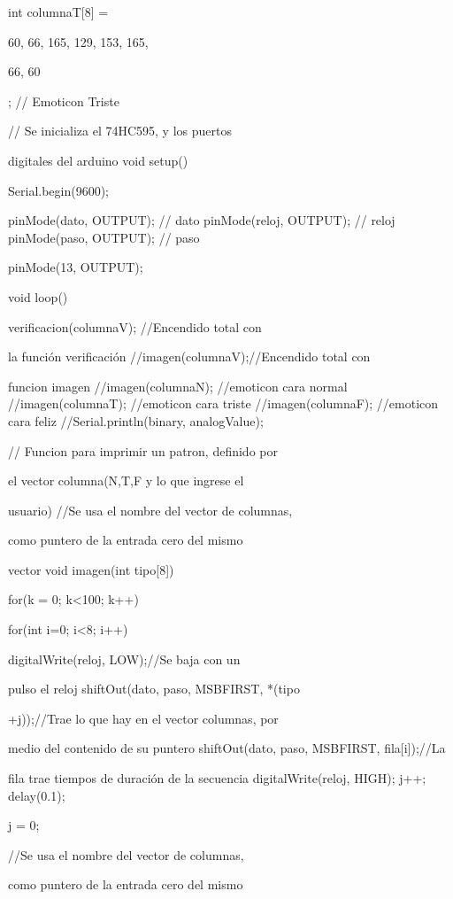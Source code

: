\documentclass{article}
\begin{document}
int columnaT[8] = {60, 66, 165, 129, 153, 165, 

66, 60}; // Emoticon Triste

// Se inicializa el 74HC595, y los puertos 

digitales del arduino
void setup()
{
  Serial.begin(9600);
 
  pinMode(dato, OUTPUT); // dato
  pinMode(reloj, OUTPUT); // reloj
  pinMode(paso, OUTPUT); // paso
  
  pinMode(13, OUTPUT);
}


void loop()
{
   verificacion(columnaV); //Encendido total con 

la función verificación
  //imagen(columnaV);//Encendido total con 

funcion imagen
   //imagen(columnaN); //emoticon cara normal
   //imagen(columnaT); //emoticon cara triste
  //imagen(columnaF); //emoticon cara feliz
  //Serial.println(binary, analogValue);
   
}
  
// Funcion para imprimir un patron, definido por 

el vector columna(N,T,F y lo que ingrese el 

usuario)
//Se usa el nombre del vector de columnas, 

como puntero de la entrada cero del mismo 

vector
void imagen(int tipo[8])
{
  for(k = 0; k<100; k++)
  {
    for(int i=0; i<8; i++)
    {
      digitalWrite(reloj, LOW);//Se baja con un 

pulso el reloj
      shiftOut(dato, paso, MSBFIRST, *(tipo

+j));//Trae lo que hay en el vector columnas, por 

medio del contenido de su puntero
      shiftOut(dato, paso, MSBFIRST, fila[i]);//La 

fila trae tiempos de duración de la secuencia
      digitalWrite(reloj, HIGH);
      j++;
    delay(0.1);  
    }
    j = 0;
    
  }
  
}
//Se usa el nombre del vector de columnas, 

como puntero de la entrada cero del mismo 
\end{document}
